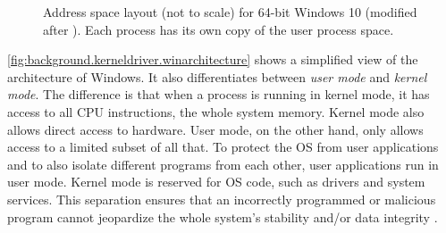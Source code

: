 \begin{figure}[htb!]
	\center
	\caption[
		Address space layout for 64-bit Windows 10.
	]{
		Address space layout (not to scale) for 64-bit Windows 10 (modified after \cite{Yosifovich2017}). %
		Each process has its own copy of the user process space\footnotemark.
	}
	\label{fig:background.kerneldriver.winvirtualmemory}
\end{figure}

\autoref{fig:background.kerneldriver.winarchitecture} shows a simplified view of the architecture of Windows. It also differentiates between \emph{user mode} and \emph{kernel mode}. The difference is that when a process is running in kernel mode, it has access to all CPU instructions, the whole system memory. Kernel mode also allows direct access to hardware. User mode, on the other hand, only allows access to a limited subset of all that. To protect the OS from user applications and to also isolate different programs from each other, user applications run in user mode. Kernel mode is reserved for OS code, such as drivers and system services. This separation ensures that an incorrectly programmed or malicious program cannot jeopardize the whole system's stability and/or data integrity \cite{Yosifovich2017}.

